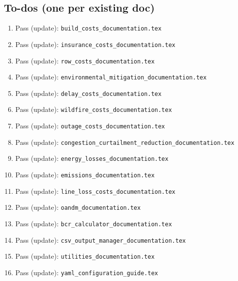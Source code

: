 \documentclass[12pt]{article}
\begin{document}
\subsection{To-dos (one per existing doc)}

\begin{enumerate}
  \item Pass (update): \texttt{build\_costs\_documentation.tex}
  \item Pass (update): \texttt{insurance\_costs\_documentation.tex}
  \item Pass (update): \texttt{row\_costs\_documentation.tex}
  \item Pass (update): \texttt{environmental\_mitigation\_documentation.tex}
  \item Pass (update): \texttt{delay\_costs\_documentation.tex}
  \item Pass (update): \texttt{wildfire\_costs\_documentation.tex}
  \item Pass (update): \texttt{outage\_costs\_documentation.tex}
  \item Pass (update): \texttt{congestion\_curtailment\_reduction\_documentation.tex}
  \item Pass (update): \texttt{energy\_losses\_documentation.tex}
  \item Pass (update): \texttt{emissions\_documentation.tex}
  \item Pass (update): \texttt{line\_loss\_costs\_documentation.tex}
  \item Pass (update): \texttt{oandm\_documentation.tex}
  \item Pass (update): \texttt{bcr\_calculator\_documentation.tex}
  \item Pass (update): \texttt{csv\_output\_manager\_documentation.tex}
  \item Pass (update): \texttt{utilities\_documentation.tex}
  \item Pass (update): \texttt{yaml\_configuration\_guide.tex}
\end{enumerate}
\end{document}
